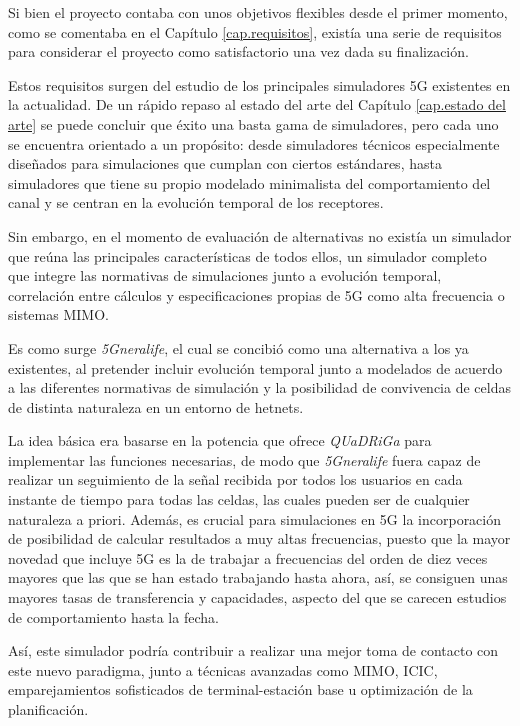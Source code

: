 Si bien el proyecto contaba con unos objetivos flexibles desde el primer momento, como se comentaba en el Capítulo \ref{cap.requisitos}, existía una serie de requisitos para considerar el proyecto como satisfactorio una vez dada su finalización.

Estos requisitos surgen del estudio de los principales simuladores 5G existentes en la actualidad. De un rápido repaso al estado del arte del Capítulo \ref{cap.estado del arte} se puede concluir que éxito una basta gama de simuladores, pero cada uno se encuentra orientado a un propósito: desde simuladores técnicos especialmente diseñados para simulaciones que cumplan con ciertos estándares, hasta simuladores que tiene su propio modelado minimalista del comportamiento del canal y se centran en la evolución temporal de los receptores.

Sin embargo, en el momento de evaluación de alternativas no existía un simulador que reúna las principales características de todos ellos, un simulador completo que integre las normativas de simulaciones junto a evolución temporal, correlación entre cálculos y especificaciones propias de 5G como alta frecuencia o sistemas MIMO.

Es como surge \textit{5Gneralife}, el cual se concibió como una alternativa a los ya existentes, al pretender incluir evolución temporal junto a modelados de acuerdo a las diferentes normativas de simulación y la posibilidad de convivencia de celdas de distinta naturaleza en un entorno de \acs{hetnet}s.

La idea básica era basarse en la potencia que ofrece \textit{QUaDRiGa} para implementar las funciones necesarias, de modo que \textit{5Gneralife} fuera capaz de realizar un seguimiento de la señal recibida por todos los usuarios en cada instante de tiempo para todas las celdas, las cuales pueden ser de cualquier naturaleza a priori. Además, es crucial para simulaciones en 5G la incorporación de posibilidad de calcular resultados a muy altas frecuencias, puesto que la mayor novedad que incluye 5G es la de trabajar a frecuencias del orden de diez veces mayores que las que se han estado trabajando hasta ahora, así, se consiguen unas mayores tasas de transferencia y capacidades, aspecto del que se carecen estudios de comportamiento hasta la fecha.

Así, este simulador podría contribuir a realizar una mejor toma de contacto con este nuevo paradigma, junto a técnicas avanzadas como MIMO, ICIC, emparejamientos sofisticados de terminal-estación base u optimización de la planificación.

